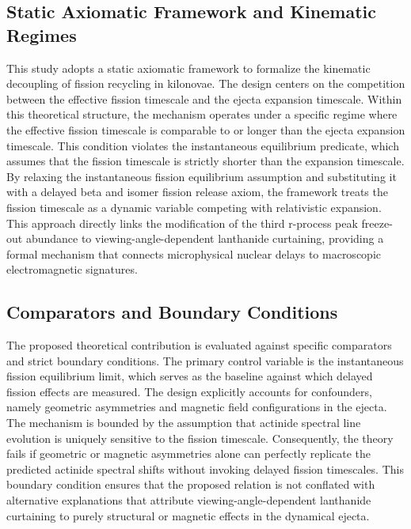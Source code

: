 \documentclass[conference]{IEEEtran}
\begin{document}
\subsection{Static Axiomatic Framework and Kinematic Regimes}
This study adopts a static axiomatic framework to formalize the kinematic decoupling of fission recycling in kilonovae. The design centers on the competition between the effective fission timescale and the ejecta expansion timescale. Within this theoretical structure, the mechanism operates under a specific regime where the effective fission timescale is comparable to or longer than the ejecta expansion timescale. This condition violates the instantaneous equilibrium predicate, which assumes that the fission timescale is strictly shorter than the expansion timescale. By relaxing the instantaneous fission equilibrium assumption and substituting it with a delayed beta and isomer fission release axiom, the framework treats the fission timescale as a dynamic variable competing with relativistic expansion. This approach directly links the modification of the third r-process peak freeze-out abundance to viewing-angle-dependent lanthanide curtaining, providing a formal mechanism that connects microphysical nuclear delays to macroscopic electromagnetic signatures.

\subsection{Comparators and Boundary Conditions}
The proposed theoretical contribution is evaluated against specific comparators and strict boundary conditions. The primary control variable is the instantaneous fission equilibrium limit, which serves as the baseline against which delayed fission effects are measured. The design explicitly accounts for confounders, namely geometric asymmetries and magnetic field configurations in the ejecta. The mechanism is bounded by the assumption that actinide spectral line evolution is uniquely sensitive to the fission timescale. Consequently, the theory fails if geometric or magnetic asymmetries alone can perfectly replicate the predicted actinide spectral shifts without invoking delayed fission timescales. This boundary condition ensures that the proposed relation is not conflated with alternative explanations that attribute viewing-angle-dependent lanthanide curtaining to purely structural or magnetic effects in the dynamical ejecta.
\end{document}
